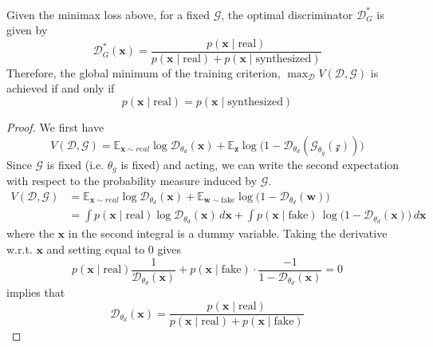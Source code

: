 \documentclass{article}
\begin{document}
  \begin{theorem}
    \label{thm:global-optimality}
 
    Given the minimax loss above, for a fixed $\mathcal{G}$, the optimal discriminator $\mathcal{D}_G^\ast$ is given by 
    \begin{equation}
      \mathcal{D}_G^\ast (\mathbf{x}) = \frac{p(\mathbf{x} \mid \text{real})}{p(\mathbf{x} \mid \text{real}) + p(\mathbf{x} \mid \text{synthesized})}
    \end{equation}
    Therefore, the global minimum of the training criterion, $\max_{\mathcal{D}} V(\mathcal{D}, \mathcal{G})$ is achieved if and only if 
    \begin{equation}
      p(\mathbf{x} \mid \text{real}) = p(\mathbf{x} \mid \text{synthesized})
    \end{equation}
  \end{theorem}
  \begin{proof} 
    We first have 
    \begin{equation}
      V(\mathcal{D}, \mathcal{G}) = \mathbb{E}_{\mathbf{x} \sim real} \log \mathcal{D}_{\theta_d} (\mathbf{x}) + \mathbb{E}_{\mathbf{z}} \log \big( 1 - \mathcal{D}_{\theta_d} (\mathcal{G}_{\theta_g} (\mathcal{z}))\big) 
    \end{equation}
    Since $\mathcal{G}$ is fixed (i.e. $\theta_g$ is fixed) and acting, we can write the second expectation with respect to the probability measure induced by $\mathcal{G}$.
    \begin{align*} 
      V(\mathcal{D}, \mathcal{G}) & = \mathbb{E}_{\mathbf{x} \sim real} \log \mathcal{D}_{\theta_d} (\mathbf{x}) + \mathbb{E}_{\mathbf{w} \sim \text{fake}} \log \big( 1 - \mathcal{D}_{\theta_d} (\mathbf{w}) \big) \\   
                                      & = \int p(\mathbf{x} \mid \text{real}) \log \mathcal{D}_{\theta_d}(\mathbf{x}) \,d\mathbf{x}+ \int p(\mathbf{x} \mid \text{fake}) \, \log \big( 1 - \mathcal{D}_{\theta_d} (\mathbf{x}) \big) \,d\mathbf{x} 
    \end{align*}
    where the $\mathbf{x}$ in the second integral is a dummy variable. Taking the derivative w.r.t. $\mathbf{x}$ and setting equal to $0$ gives 
    \begin{equation}
      p(\mathbf{x} \mid \text{real}) \frac{1}{\mathcal{D}_{\theta_d} (\mathbf{x})} + p(\mathbf{x} \mid \text{fake}) \cdot \frac{-1}{1 - \mathcal{D}_{\theta_d}(\mathbf{x})} = 0
    \end{equation}
    implies that 
    \begin{equation}
      \mathcal{D}_{\theta_d}( \mathbf{x}) = \frac{p(\mathbf{x} \mid \text{real})}{p(\mathbf{x} \mid \text{real}) + p(\mathbf{x} \mid \text{fake})}
    \end{equation}
  \end{proof} 
\end{document}
